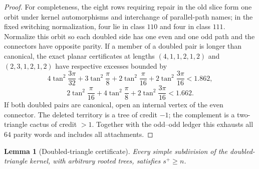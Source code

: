 \documentclass[11pt]{article}
\newtheorem{lemma}[theorem]{Lemma}
\theoremstyle{remark}
\newcommand{\splus}{s^+}
\begin{document}
\begin{proof}
For completeness, the eight rows requiring repair in the old slice form one
orbit under kernel automorphisms and interchange of parallel-path names; in the fixed switching
normalization, four lie in class $110$ and four in class $111$. Normalize this
orbit so each doubled side has one even and one odd path and the connectors
have opposite parity. If a member of a
doubled pair is longer than canonical, the exact planar certificates at
lengths $(4,1,1,2,1,2)$ and $(2,3,1,2,1,2)$ have respective excesses bounded
by
\[
 4\tan^2\frac{3\pi}{32}+3\tan^2\frac\pi8
 +2\tan^2\frac\pi{16}+2\tan^2\frac{3\pi}{16}<1.862,
\]
\[
 2\tan^2\frac\pi{16}+4\tan^2\frac\pi8
 +2\tan^2\frac{3\pi}{16}<1.662.
\]
If both doubled pairs are canonical, open an internal vertex of the even
connector.  The deleted territory is a tree of credit $-1$; the complement is
a two-triangle cactus of credit $>1$.  Together with the odd--odd ledger this
exhausts all $64$ parity words and includes all attachments.
\end{proof}

\begin{lemma}[Doubled-triangle certificate]\label{lem:dtri}
Every simple subdivision of the doubled-triangle kernel, with arbitrary rooted
trees, satisfies $\splus\geq n$.
\end{lemma}
\end{document}
